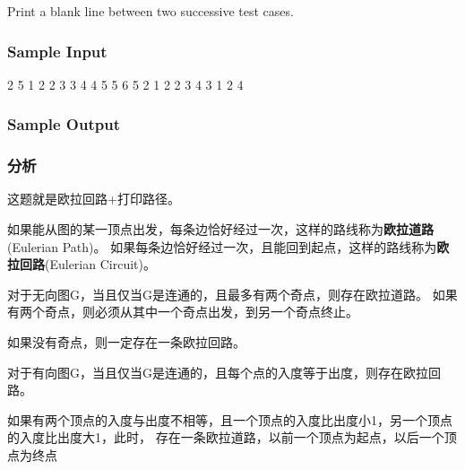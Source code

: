 Print a blank line between two successive test cases.

\subsubsection{Sample Input}
\begin{Code}
2
5
1 2
2 3
3 4
4 5
5 6
5
2 1
2 2
3 4
3 1
2 4
\end{Code}

\subsubsection{Sample Output}

\subsubsection{分析}
这题就是欧拉回路+打印路径。

如果能从图的某一顶点出发，每条边恰好经过一次，这样的路线称为\textbf{欧拉道路}(Eulerian Path)。
如果每条边恰好经过一次，且能回到起点，这样的路线称为\textbf{欧拉回路}(Eulerian Circuit)。

对于无向图G，当且仅当G是连通的，且最多有两个奇点，则存在欧拉道路。
如果有两个奇点，则必须从其中一个奇点出发，到另一个奇点终止。

如果没有奇点，则一定存在一条欧拉回路。

对于有向图G，当且仅当G是连通的，且每个点的入度等于出度，则存在欧拉回路。

如果有两个顶点的入度与出度不相等，且一个顶点的入度比出度小1，另一个顶点的入度比出度大1，此时，
存在一条欧拉道路，以前一个顶点为起点，以后一个顶点为终点


